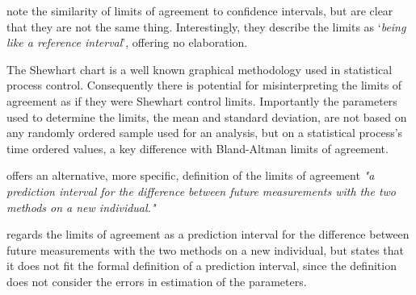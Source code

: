 \documentclass[12pt, a4paper]{report}
\theoremstyle{plain}
\theoremstyle{definition}
\theoremstyle{remark}
\begin{document}
%


\citet{BA99} note the similarity of limits of agreement to
confidence intervals, but are clear that they are not the same thing. Interestingly, they describe the limits as `\textit{being like a reference interval}', offering no elaboration.

The Shewhart chart is a well known graphical
methodology used in statistical process control. Consequently
there is potential for misinterpreting the limits of agreement as
if they were Shewhart control limits. Importantly the
parameters used to determine the limits, the mean and standard
deviation, are not based on any  randomly ordered sample used for an analysis, but on a statistical process's time ordered values, a key difference with Bland-Altman limits of agreement.

\citet{BXC2008} offers an alternative, more specific,  definition of
the limits of agreement \emph{"a prediction interval for the
	difference between future measurements with the two methods on a
	new individual."}

\citet{BXC2008} regards the limits of agreement as a prediction
interval for the difference between future measurements with the
two methods on a new individual, but states that it does not fit
the formal definition of a prediction interval, since the
definition does not consider the errors in estimation of the
parameters. 
\end{document}
